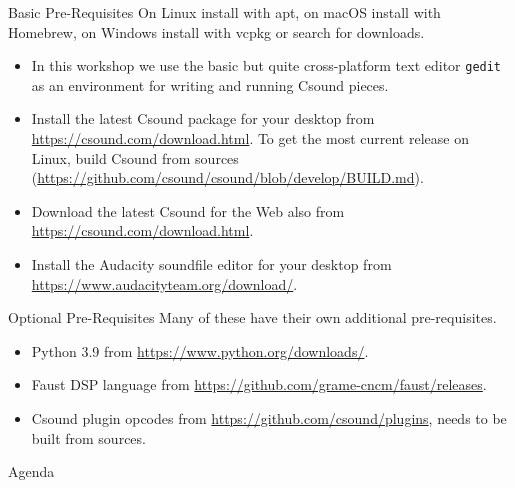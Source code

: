 \documentclass{beamer}
\begin{document}
    \begin{frame}{Basic Pre-Requisites}
    	On Linux install with apt, on macOS install with Homebrew, on Windows install with vcpkg or 
	search for downloads.
        \begin{itemize}
            \item In this workshop we use the basic but quite cross-platform text editor \texttt{gedit} 
            as an environment for writing and running Csound pieces.
            \item Install the latest Csound package for your desktop from
            \url{https://csound.com/download.html}. To get the most current release on
            Linux, build Csound from sources 
            (\url{https://github.com/csound/csound/blob/develop/BUILD.md}).
            \item Download the latest Csound for the Web also from 
            \url{https://csound.com/download.html}.
            \item Install the Audacity soundfile editor for your desktop from
            \url{https://www.audacityteam.org/download/}.
        \end{itemize}
    \end{frame}
    
    \begin{frame}{Optional Pre-Requisites}
        Many of these have their own additional pre-requisites. 
        \begin{itemize}
            \item Python 3.9 from \url{https://www.python.org/downloads/}.
            \item Faust DSP language from
            \url{https://github.com/grame-cncm/faust/releases}.
            \item Csound plugin opcodes from
            \url{https://github.com/csound/plugins}, needs to be built from sources.
        \end{itemize}
    \end{frame}
    
    \begin{frame}{Agenda}
        \tableofcontents
    \end{frame}
    
\end{document}
